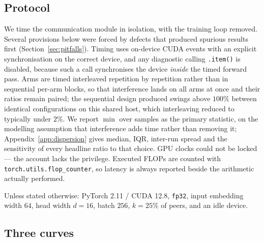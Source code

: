 \subsection{Protocol}
\label{sec:protocol}

We time the communication module in isolation, with the training loop removed.
Several provisions below were forced by defects that produced spurious results
first (Section~\ref{sec:pitfalls}). Timing uses on-device CUDA events with an
explicit synchronisation on the correct device, and any diagnostic calling
\texttt{.item()} is disabled, because such a call synchronises the device
\emph{inside} the timed forward pass. Arms are timed interleaved repetition by
repetition rather than in sequential per-arm blocks, so that interference lands
on all arms at once and their ratios remain paired; the sequential design
produced swings above $100\%$ between identical configurations on this shared
host, which interleaving reduced to typically under $2\%$. We report $\min$ over
samples as the primary statistic, on the modelling assumption that interference
adds time rather than removing it; Appendix~\ref{app:dispersion} gives median,
IQR, inter-run spread and the sensitivity of every headline ratio to that
choice. GPU clocks could not be locked --- the account lacks the privilege.
Executed FLOPs are counted with \texttt{torch.utils.flop\_counter}, so latency
is always reported beside the arithmetic actually performed.

Unless stated otherwise: PyTorch 2.11 / CUDA 12.8, \texttt{fp32}, input
embedding width $64$, head width $d{=}16$, batch $256$, $k = 25\%$ of peers,
and an idle device.

\subsection{Three curves}
\label{sec:threecurves}

